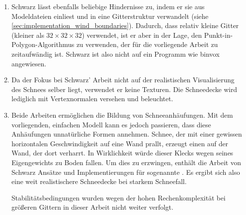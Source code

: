 \begin{enumerate}
\item Schwarz lässt ebenfalls beliebige Hindernisse zu, indem er sie
aus Modeldateien einliest und in eine Gitterstruktur verwandelt (siehe
\autoref{sec:implementation_wind_boundaries}). Dadurch, dass relativ
kleine Gitter (kleiner als $32 \times 32 \times 32$) verwendet, ist er
aber in der Lage, den Punkt-in-Polygon-Algorithmus zu verwenden, der
für die vorliegende Arbeit zu zeitaufwändig ist. Schwarz ist also
nicht auf ein Programm wie binvox angewiesen.
\item Da der Fokus bei Schwarz' Arbeit nicht auf der realistischen
Visualisierung des Schnees selber liegt, verwendet er keine
Texturen. Die Schneedecke wird lediglich mit Vertexnormalen versehen
und beleuchtet.
\item Beide Arbeiten ermöglichen die Bildung von
Schneeanhäufungen. Mit dem vorliegenden, einfachen Modell kann es
jedoch passieren, dass diese Anhäufungen unnatürliche Formen
annehmen. Schnee, der mit einer gewissen horizontalen Geschwindigkeit
auf eine Wand prallt, erzeugt einen  auf der
Wand, der dort verharrt. In Wirklichkeit würde dieser Klecks wegen
seines Eigengewichts zu Boden fallen. Um dies zu erzwingen, enthält
die Arbeit von Schwarz Ansätze und Implementierungen für sogenannte
. Es ergibt sich also eine weit
realistischere Schneedecke bei starkem Schneefall.

Stabilitätsbedingungen wurden wegen der hohen Rechenkomplexität bei
größeren Gittern in dieser Arbeit nicht weiter verfolgt.
\end{enumerate}
